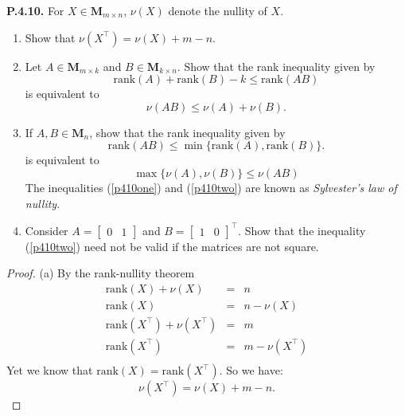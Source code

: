 \documentclass[12pt]{amsart}
\begin{document}
\begin{onehalfspace}
        \noindent\textbf{P.4.10.} For $X\in\mathbf{M}_{m\times n}$, $\nu(X)$ denote the nullity of $X$.
        \begin{enumerate}[label=(\alph*)]
            \item Show that $\nu(X^\top) = \nu(X) + m - n$.
            \item Let $A\in\mathbf{M}_{m\times k}$ and $B\in\mathbf{M}_{k\times n}$.
                  Show that the rank inequality given by
                \begin{displaymath}
                    \text{rank}(A) + \text{rank}(B) - k \le \text{rank}(AB)
                \end{displaymath}
                  is equivalent to
                \begin{equation}
                    \nu(AB) \le \nu(A) + \nu(B).
                    \label{p410one}
                \end{equation}
            \item If $A,B\in\mathbf{M}_{n}$, show that the rank inequality given by
            \begin{displaymath}
                \text{rank}(AB) \le \min\{\text{rank}(A), \text{rank}(B)\}.
            \end{displaymath}
            is equivalent to
            \begin{equation}
                \max\{\nu(A),\nu(B)\}\le\nu(AB)
                \label{p410two}
            \end{equation}
            The inequalities (\ref{p410one}) and (\ref{p410two}) are known as \emph{Sylvester's law of nullity}.
            \item Consider $A = [\begin{matrix}0 & 1\end{matrix}]$ and $B = [\begin{matrix}1 & 0\end{matrix}]^\top$.
                  Show that the inequality (\ref{p410two}) need not be valid if the matrices are not square.
        \end{enumerate}
        \begin{proof}
            (a) By the rank-nullity theorem
            \begin{eqnarray*}
                \text{rank}(X) + \nu(X) & = & n\\
                \text{rank}(X) & = & n - \nu(X)\\
                \text{rank}(X^\top) + \nu(X^\top) & = & m\\
                \text{rank}(X^\top) & = & m - \nu(X^\top)\\
            \end{eqnarray*}
            Yet we know that $\text{rank}(X) = \text{rank}(X^\top)$.
            So we have:
            \begin{displaymath}
                \nu(X^\top) = \nu(X) + m - n.
            \end{displaymath}


\end{proof}
\end{onehalfspace}
\end{document}
